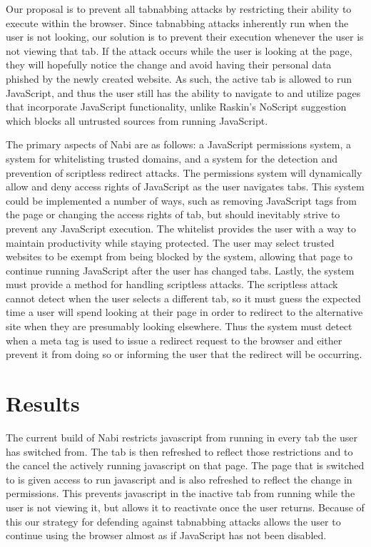 \documentclass[12pt]{article}
\begin{document}
\begin{doublespace}
Our proposal is to prevent all tabnabbing attacks by restricting their ability to execute within the browser. Since tabnabbing attacks inherently run when the user is not looking, our solution is to prevent their execution whenever the user is not viewing that tab. If the attack occurs while the user is looking at the page, they will hopefully notice the change and avoid having their personal data phished by the newly created website. As such, the active tab is allowed to run JavaScript, and thus the user still has the ability to navigate to and utilize pages that incorporate JavaScript functionality, unlike Raskin's NoScript suggestion which blocks all untrusted sources from running JavaScript.

The primary aspects of Nabi are as follows: a JavaScript permissions system, a system for whitelisting trusted domains, and a system for the detection and prevention of scriptless redirect attacks. The permissions system will dynamically allow and deny access rights of JavaScript as the user navigates tabs. This system could be implemented a number of ways, such as removing JavaScript tags from the page or changing the access rights of tab, but should inevitably strive to prevent any JavaScript execution. The whitelist provides the user with a way to maintain productivity while staying protected. The user may select trusted websites to be exempt from being blocked by the system, allowing that page to continue running JavaScript after the user has changed tabs. Lastly, the system must provide a method for handling scriptless attacks. The scriptless attack cannot detect when the user selects a different tab, so it must guess the expected time a user will spend looking at their page in order to redirect to the alternative site when they are presumably looking elsewhere. Thus the system must detect when a meta tag is used to issue a redirect request to the browser and either prevent it from doing so or informing the user that the redirect will be occurring.

\section{Results}
The current build of Nabi restricts javascript from running in every tab the user has switched from. The tab is then refreshed to reflect those restrictions and to the cancel the actively running javascript on that page. The page that is switched to is given access to run javascript and is also refreshed to reflect the change in permissions. This prevents javascript in the inactive tab from running while the user is not viewing it, but allows it to reactivate once the user returns. Because of this our strategy for defending against tabnabbing attacks allows the user to continue using the browser almost as if JavaScript has not been disabled.


\end{doublespace}
\end{document}

